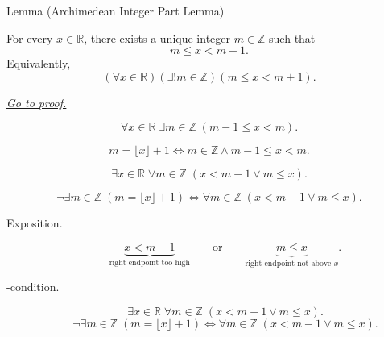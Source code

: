 \begin{lemmabox}{Lemma (Archimedean Integer Part Lemma)}
\begin{lemma}
\label{lem:archimedean-integer-part-lemma}
For every $x\in\mathbb{R}$, there exists a unique integer $m\in\mathbb{Z}$
such that
\[
  m\leq x<m+1.
\]
Equivalently,
\[
  (\forall x\in\mathbb{R})(\exists!m\in\mathbb{Z})(m\leq x<m+1).
\]

\smallskip
\noindent
\hyperref[prf:archimedean-integer-part-lemma]{\textit{Go to proof.}}
\end{lemma}
\end{lemmabox}

\begin{remark*}
\[
\forall x\in\mathbb{R}\;\exists m\in\mathbb{Z}\;(m-1\le x<m).
\]
\end{remark*}

\begin{remark*}
\[
m=\lfloor x\rfloor+1
\Longleftrightarrow
m\in\mathbb{Z}\land m-1\le x<m.
\]
\end{remark*}

\begin{remark*}
\[
\exists x\in\mathbb{R}\;\forall m\in\mathbb{Z}\;(x<m-1\lor m\le x).
\]
\end{remark*}

\begin{remark*}
\[
\neg\exists m\in\mathbb{Z}\;(m=\lfloor x\rfloor+1)
\Longleftrightarrow
\forall m\in\mathbb{Z}\;(x<m-1\lor m\le x).
\]
\end{remark*}

\begin{remark*}
\begin{description}
  \item[Exposition.]
\[
\underbrace{x<m-1}_{\text{right endpoint too high}}
\qquad\text{or}\qquad
\underbrace{m\le x}_{\text{right endpoint not above }x}.
\]


  \item[\exists-condition.]
  \[
\exists x\in\mathbb{R}\;\forall m\in\mathbb{Z}\;(x<m-1\lor m\le x).
\]
\[
\neg\exists m\in\mathbb{Z}\;(m=\lfloor x\rfloor+1)
\Longleftrightarrow
\forall m\in\mathbb{Z}\;(x<m-1\lor m\le x).
\]
\end{description}
\end{remark*}


